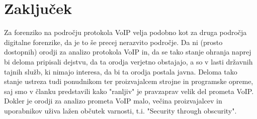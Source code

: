 \documentclass{acm_proc_article-sp}
\begin{document}
%
%
%
\section{Zaključek}
Za forenziko na področju protokola VoIP velja podobno kot za druga področja digitalne forenzike, da je to še precej nerazvito področje. Da ni (prosto dostopnih) orodji za analizo protokola VoIP in, da se tako stanje ohranja naprej bi deloma pripisali dejstvu, da ta orodja verjetno obstajajo, a so v lasti državnih tajnih služb, ki nimajo interesa, da bi ta orodja postala javna. Deloma tako stanje ustreza tudi ponudnikom ter proizvajalcem strojne in programske opreme, saj smo v članku predstavili kako "ranljiv" je pravzaprav velik del prometa VoIP. Dokler je orodji za analizo prometa VoIP malo, večina proizvajalcev in uporabnikov uživa lažen občutek varnosti, t.i. "Security through obscurity".


\end{document}

